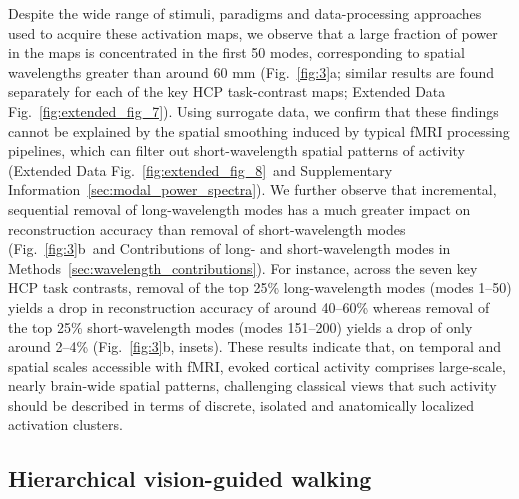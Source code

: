\documentclass[sn-mathphys-num]{sn-jnl}%
\theoremstyle{thmstyleone}%
\theoremstyle{thmstyletwo}%
\theoremstyle{thmstylethree}%
\begin{document}
Despite the wide range of stimuli, paradigms and data-processing approaches used to acquire these activation maps, we observe that a large fraction of power in the maps is concentrated in the first 50 modes, corresponding to spatial wavelengths greater than around 60 mm (Fig.~\ref{fig:3}a; similar results are found separately for each of the key HCP task-contrast maps; Extended Data Fig.~\ref{fig:extended_fig_7}). 
Using surrogate data, we confirm that these findings cannot be explained by the spatial smoothing  induced by typical fMRI processing pipelines, which can filter out short-wavelength spatial patterns of activity (Extended Data Fig.~\ref{fig:extended_fig_8}~and Supplementary Information~\ref{sec:modal_power_spectra}). 
We further observe that incremental, sequential removal of long-wavelength modes has a much greater impact on reconstruction accuracy than removal of short-wavelength modes (Fig.~\ref{fig:3}b~and Contributions of long- and short-wavelength modes in Methods~\ref{sec:wavelength_contributions}). 
For instance, across the seven key HCP task contrasts, removal of the top 25\% long-wavelength modes (modes 1–50) yields a drop in reconstruction accuracy of around 40–60\% whereas removal of the top 25\% short-wavelength modes (modes 151–200) yields a drop of only around 2–4\% (Fig.~\ref{fig:3}b, insets). 
These results indicate that, on temporal and spatial scales accessible with fMRI, evoked cortical activity comprises large-scale, nearly brain-wide spatial patterns, challenging classical views that such activity should be described in terms of discrete, isolated and anatomically localized activation clusters.


\subsection{Hierarchical vision-guided walking}


\end{document}
